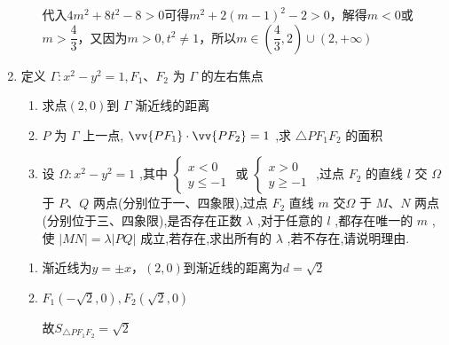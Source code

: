 \begin{enumerate}
\begin{jieda}
\begin{enumerate}
            代入$4m^2+8t^2-8 > 0$可得$m^2+2(m-1)^2-2>0$，解得$m < 0$或$m > \dfrac{4}{3}$，又因为$m > 0, t^2 \neq 1$，所以$m \in \left(\dfrac{4}{3}, 2\right) \cup (2, +\infty)$
        \end{enumerate}
    \end{jieda}

    \item 定义 $\Gamma  : {x}^{2} - {y}^{2} = 1,{F}_{1}\text{、}{F}_{2}$ 为 $\Gamma$ 的左右焦点 
    \begin{enumerate}
        \item 求点$(2,0)$到 $\Gamma$ 渐近线的距离
        \item ${P}$ 为 $\Gamma$ 上一点, $\vv{P{F}_{1}} \cdot  \vv{P{F}_{2}} = 1$ ,求 $\bigtriangleup P{F}_{1}{F}_{2}$ 的面积
        \item 设 $\Omega  : {x}^{2} - {y}^{2} = 1$ ,其中 $\left\{  \begin{array}{l} x < 0 \\  y \leq   - 1 \end{array}\right.$ 或 $\left\{  \begin{array}{l} x > 0 \\  y \geq   - 1 \end{array}\right.$ ,过点 ${F}_{2}$ 的直线 $l$ 交 $\Omega$ 于 $P\text{、}Q$ 两点(分别位于一、四象限),过点 ${F}_{2}$ 直线 $m$ 交$\Omega$ 于 $M\text{、}N$ 两点 (分别位于三、四象限),是否存在正数 $\lambda$ ,对于任意的 $l$ ,都存在唯一的 $m$ ,使 $\left| {MN}\right|  = \lambda \left| {PQ}\right|$ 成立,若存在,求出所有的 $\lambda$ ,若不存在,请说明理由.
    \end{enumerate}
    \begin{jieda}
        \begin{enumerate}
            \item 渐近线为$y = \pm x$，$(2, 0)$到渐近线的距离为$d = \sqrt{2}$
            \item $F_1(-\sqrt{2}, 0), F_2(\sqrt{2}, 0)$
            \begin{dingautolist}{172}
                \item 设$P(x_0, y_0)$，$\vv{PF_1} \cdot \vv{PF_2} = |\vv{OP}|^2 - 2 = 1$，故$\left\{\begin{array}{l}
                     x_0^2 + y_0^2 = 3 \\
                     x_0^2 - y_0^2 = 1
                \end{array}\right.$，故$y_0 = \pm 1$
                \item 设$P\left(\dfrac{1}{cos\theta}, tan\theta\right), \theta \in \left[0, 2\pi\right)$且$\theta \neq \dfrac{\pi}{2}, \dfrac{3\pi}{2}$，则$\vv{PF_1} = \left(-\sqrt{2} - \dfrac{1}{cos\theta}, -tan\theta\right)$，$\vv{PF_2} = \left(\sqrt{2} - \dfrac{1}{cos\theta}, -tan\theta\right)$，$1 = \vv{PF_1} \cdot \vv{PF_2} = \dfrac{1}{cos^2\theta} - 2 + tan^2\theta$，即$3cos^2\theta = 1 + sin^2\theta$，即$cos^2\theta = \dfrac{1}{2}$，故$y_P = \pm 1$
            \end{dingautolist}
            故$S_{\triangle{PF_1F_2}} = \sqrt{2}$
            

\end{enumerate}
\end{jieda}
\end{enumerate}
